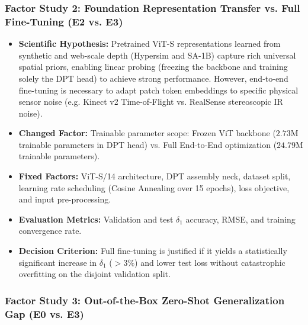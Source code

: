 \documentclass[twoside,final]{hcmut-report}
\begin{document}
\subsubsection{Factor Study 2: Foundation Representation Transfer vs. Full Fine-Tuning (E2 vs. E3)}

\begin{itemize}[leftmargin=*]

  \item \textbf{Scientific Hypothesis:} Pretrained ViT-S representations learned from synthetic and web-scale depth (Hypersim and SA-1B) capture rich universal spatial priors, enabling linear probing (freezing the backbone and training solely the DPT head) to achieve strong performance. However, end-to-end fine-tuning is necessary to adapt patch token embeddings to specific physical sensor noise (e.g. Kinect v2 Time-of-Flight vs. RealSense stereoscopic IR noise).

  \item \textbf{Changed Factor:} Trainable parameter scope: Frozen ViT backbone ($2.73\text{M}$ trainable parameters in DPT head) vs. Full End-to-End optimization ($24.79\text{M}$ trainable parameters).

  \item \textbf{Fixed Factors:} ViT-S/14 architecture, DPT assembly neck, dataset split, learning rate scheduling (Cosine Annealing over 15 epochs), loss objective, and input pre-processing.

  \item \textbf{Evaluation Metrics:} Validation and test $\delta_1$ accuracy, RMSE, and training convergence rate.

  \item \textbf{Decision Criterion:} Full fine-tuning is justified if it yields a statistically significant increase in $\delta_1$ ($>3\%$) and lower test loss without catastrophic overfitting on the disjoint validation split.

\end{itemize}

\subsubsection{Factor Study 3: Out-of-the-Box Zero-Shot Generalization Gap (E0 vs. E3)}
\end{document}
